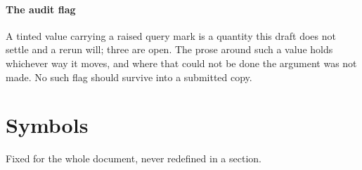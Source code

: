 \paragraph{The audit flag} A tinted value carrying a raised query mark is a
quantity this draft does not settle and a rerun will; three are open. The prose
around such a value holds whichever way it moves, and where that could not be
done the argument was not made. No such flag should survive into a submitted
copy.

\section*{Symbols}

\noindent
Fixed for the whole document, never redefined in a section.

